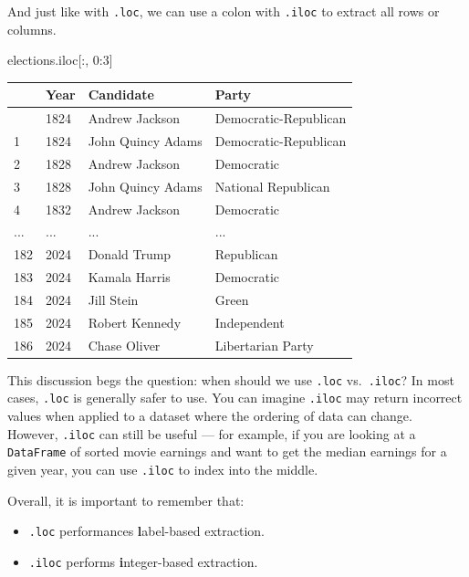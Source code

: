 \documentclass[
  letterpaper,
  DIV=11,
  numbers=noendperiod]{scrreprt}
\newenvironment{Shaded}{\begin{snugshade}}{\end{snugshade}}
\newcommand{\DecValTok}[1]{\textcolor[rgb]{0.68,0.00,0.00}{#1}}
\newcommand{\NormalTok}[1]{\textcolor[rgb]{0.00,0.23,0.31}{#1}}
\providecommand{\tightlist}{%
  \setlength{\itemsep}{0pt}\setlength{\parskip}{0pt}}\usepackage{longtable,booktabs,array}
\begin{document}
And just like with \texttt{.loc}, we can use a colon with \texttt{.iloc}
to extract all rows or columns.

\begin{Shaded}
\begin{Highlighting}[]
\NormalTok{elections.iloc[:, }\DecValTok{0}\NormalTok{:}\DecValTok{3}\NormalTok{]}
\end{Highlighting}
\end{Shaded}

\begin{longtable}[]{@{}llll@{}}
\toprule\noalign{}
& Year & Candidate & Party \\
\midrule\noalign{}
\endhead
\bottomrule\noalign{}
\endlastfoot
0 & 1824 & Andrew Jackson & Democratic-Republican \\
1 & 1824 & John Quincy Adams & Democratic-Republican \\
2 & 1828 & Andrew Jackson & Democratic \\
3 & 1828 & John Quincy Adams & National Republican \\
4 & 1832 & Andrew Jackson & Democratic \\
... & ... & ... & ... \\
182 & 2024 & Donald Trump & Republican \\
183 & 2024 & Kamala Harris & Democratic \\
184 & 2024 & Jill Stein & Green \\
185 & 2024 & Robert Kennedy & Independent \\
186 & 2024 & Chase Oliver & Libertarian Party \\
\end{longtable}

This discussion begs the question: when should we use \texttt{.loc}
vs.~\texttt{.iloc}? In most cases, \texttt{.loc} is generally safer to
use. You can imagine \texttt{.iloc} may return incorrect values when
applied to a dataset where the ordering of data can change. However,
\texttt{.iloc} can still be useful --- for example, if you are looking
at a \texttt{DataFrame} of sorted movie earnings and want to get the
median earnings for a given year, you can use \texttt{.iloc} to index
into the middle.

Overall, it is important to remember that:

\begin{itemize}
\tightlist
\item
  \texttt{.loc} performances \textbf{l}abel-based extraction.
\item
  \texttt{.iloc} performs \textbf{i}nteger-based extraction.
\end{itemize}
\end{document}
